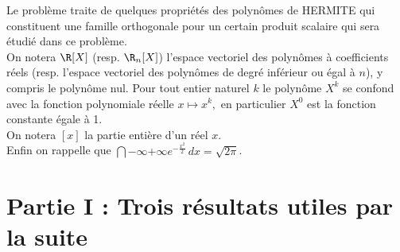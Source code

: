 \documentclass[11pt]{article}%
\begin{document}
Le problème traite de quelques propriétés des polynômes de HERMITE qui
constituent une famille orthogonale pour un certain produit scalaire
qui
sera étudié dans ce problème.\\
On notera $\R[X]$ (resp. $\R_{n}[X]$) l'espace vectoriel des
polynômes à coefficients réels (resp. l'espace vectoriel des polynômes
de
degré inférieur ou égal à $n$), y compris le polynôme nul. Pour tout
entier
naturel $k$ le polynôme $X^{k}$ se confond avec la fonction polynomiale
réelle $x\mapsto x^{k},$ en particulier $X^{0}$ est la fonction
constante égale à 1.\\
On notera $[x]$ la partie entière d'un réel $x$.\\
Enfin on rappelle que $\dint{-\infty }{+ \infty
}e^{-\frac{x^{2}}{2}}\,dx = \sqrt{2\pi }$.

\section*{Partie I : Trois résultats utiles par la suite}
\end{document}
